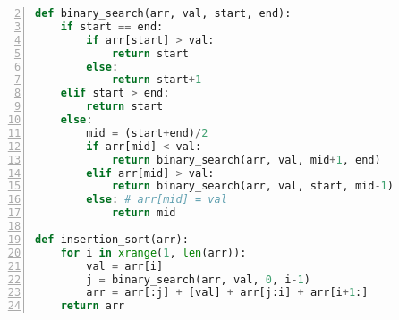 \documentclass{article}
\begin{document}
\lstlistoflistings

\begin{lstlisting}[language=python, linerange={2-20},  numbers=left, stepnumber=3, firstnumber=2, tabsize=2, frame=lRtB, float=b!, caption={[Buborék]A buborék rendezési algoritmus}]
def binary_search(arr, val, start, end):
	if start == end:
		if arr[start] > val:
			return start
		else:
			return start+1
	elif start > end:
		return start
	else: 
		mid = (start+end)/2
		if arr[mid] < val:
			return binary_search(arr, val, mid+1, end)
		elif arr[mid] > val:
			return binary_search(arr, val, start, mid-1)
		else: # arr[mid] = val
			return mid
	
def insertion_sort(arr):
    for i in xrange(1, len(arr)):
        val = arr[i]
        j = binary_search(arr, val, 0, i-1)
        arr = arr[:j] + [val] + arr[j:i] + arr[i+1:]
    return arr
\end{lstlisting}
    
\end{document}
